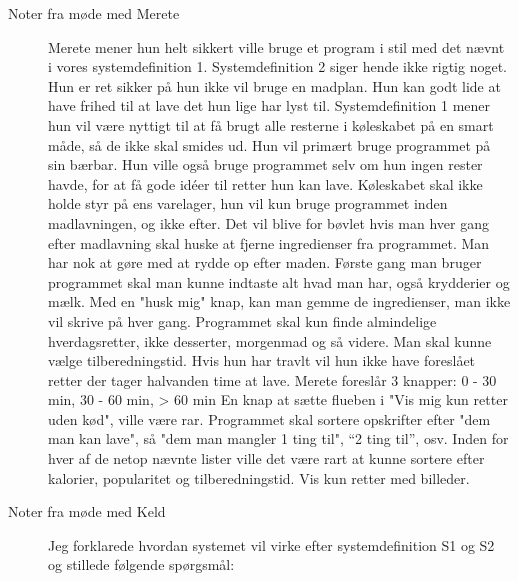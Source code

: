\begin{description}
\item[Noter fra møde med Merete]
Merete mener hun helt sikkert ville bruge et program i stil med det nævnt i vores systemdefinition 1. Systemdefinition 2 siger hende ikke rigtig noget. Hun er ret sikker på hun ikke vil bruge en madplan. Hun kan godt lide at have frihed til at lave det hun lige har lyst til. Systemdefinition 1 mener hun vil være nyttigt til at få brugt alle resterne i køleskabet på en smart måde, så de ikke skal smides ud. Hun vil primært bruge programmet på sin bærbar.
Hun ville også bruge programmet selv om hun ingen rester havde, for at få gode idéer til retter hun kan lave.
Køleskabet skal ikke holde styr på ens varelager, hun vil kun bruge programmet inden madlavningen, og ikke efter. Det vil blive for bøvlet hvis man hver gang efter madlavning skal huske at fjerne ingredienser fra programmet. Man har nok at gøre med at rydde op efter maden.
Første gang man bruger programmet skal man kunne indtaste alt hvad man har, også krydderier og mælk. Med en "husk mig" knap, kan man gemme de ingredienser, man ikke vil skrive på hver gang.
Programmet skal kun finde almindelige hverdagsretter, ikke desserter, morgenmad og så videre.
Man skal kunne vælge tilberedningstid. Hvis hun har travlt vil hun ikke have foreslået retter der tager halvanden time at lave. Merete foreslår 3 knapper: 0 - 30 min, 30 - 60 min, > 60 min
En knap at sætte flueben i "Vis mig kun retter uden kød", ville være rar.
Programmet skal sortere opskrifter efter "dem man kan lave", så "dem man mangler 1 ting til", “2 ting til”, osv.
Inden for hver af de netop nævnte lister ville det være rart at kunne sortere efter kalorier, popularitet og tilberedningstid.
Vis kun retter med billeder.

\item[Noter fra møde med Keld]
Jeg forklarede hvordan systemet vil virke efter systemdefinition S1 og S2 og stillede følgende spørgsmål:


\end{description}
